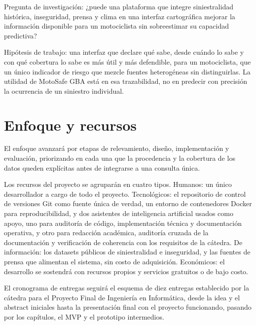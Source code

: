 Pregunta de investigación: ¿puede una plataforma que integre
siniestralidad histórica, inseguridad, prensa y clima en una interfaz
cartográfica mejorar la información disponible para un motociclista sin
sobreestimar su capacidad predictiva?

Hipótesis de trabajo: una interfaz que declare qué sabe, desde cuándo lo
sabe y con qué cobertura lo sabe es más útil y más defendible, para un
motociclista, que un único indicador de riesgo que mezcle fuentes
heterogéneas sin distinguirlas. La utilidad de MotoSafe GBA está en esa
trazabilidad, no en predecir con precisión la ocurrencia de un siniestro
individual.

\section{Enfoque y recursos}

El enfoque avanzará por etapas de relevamiento, diseño, implementación y
evaluación, priorizando en cada una que la procedencia y la cobertura de
los datos queden explícitas antes de integrarse a una consulta única.

Los recursos del proyecto se agruparán en cuatro tipos. Humanos: un
único desarrollador a cargo de todo el proyecto. Tecnológicos: el
repositorio de control de versiones Git como fuente única de verdad, un
entorno de contenedores Docker para reproducibilidad, y dos asistentes
de inteligencia artificial usados como apoyo, uno para auditoría de
código, implementación técnica y documentación operativa, y otro para
redacción académica, auditoría cruzada de la documentación y
verificación de coherencia con los requisitos de la cátedra. De
información: los datasets públicos de siniestralidad e inseguridad, y
las fuentes de prensa que alimentan el sistema, sin costo de
adquisición. Económicos: el desarrollo se sostendrá con recursos propios
y servicios gratuitos o de bajo costo.

El cronograma de entregas seguirá el esquema de diez entregas
establecido por la cátedra para el Proyecto Final de Ingeniería en
Informática, desde la idea y el abstract iniciales hasta la presentación
final con el proyecto funcionando, pasando por los capítulos, el MVP y
el prototipo intermedios.

